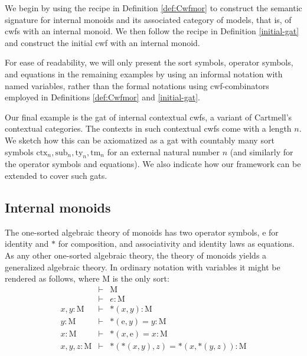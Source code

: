 \documentclass{lmcs}
\def\Mon{\mathrm{M}}
\def\idmon{\mathrm{e}}
\def\comp{\mathrm{*}}
\newcommand{\ctx}{\mathrm{ctx}}
\newcommand{\sub}{\mathrm{sub}}
\newcommand{\ty}{\mathrm{ty}}
\newcommand{\tm}{\mathrm{tm}}
\begin{document}
We begin by using the recipe in Definition \ref{def:Cwfmor} to construct the semantic signature for internal monoids and its associated category of models, that is, of cwfs with an internal monoid. We then follow the recipe in Definition \ref{initial-gat} and construct the initial cwf with an internal monoid. 

For ease of readability, we will only present the sort symbols, operator symbols, and equations in the remaining examples by using an informal notation with named variables, rather than the formal notations using cwf-combinators employed in Definitions \ref{def:Cwfmor} and \ref{initial-gat}.

Our final example is the gat of internal contextual cwfs, a variant of Cartmell's contextual categories. The contexts in such contextual cwfs come with a length $n$. We sketch how this can be axiomatized as a gat with countably many sort symbols $\ctx_n, \sub_n, \ty_n, \tm_n$ for an external natural number $n$ (and similarly for the operator symbols and equations). We also indicate how our framework can be extended to cover such gats.

\subsection{Internal monoids}\label{monoids}
 The one-sorted algebraic theory of monoids has two operator symbols,
$\idmon$ for identity and $\comp$ for composition, and associativity and identity laws as equations.
As any other one-sorted algebraic theory, the theory of monoids yields a
generalized algebraic theory. In ordinary notation with variables it might be rendered as follows, where $\Mon$ is the only sort:
\begin{eqnarray*}
&\vdash& \Mon\\
&\vdash& e : \Mon\\
x, y : \Mon &\vdash& \comp(x,y) : \Mon\\
y : \Mon &\vdash& \comp(\idmon,y) = y : \Mon\\
x : \Mon &\vdash& \comp(x,\idmon) = x : \Mon\\
x, y, z : \Mon &\vdash& \comp(\comp(x,y),z) = \comp(x,\comp(y,z)) : \Mon
\end{eqnarray*}
\end{document}
